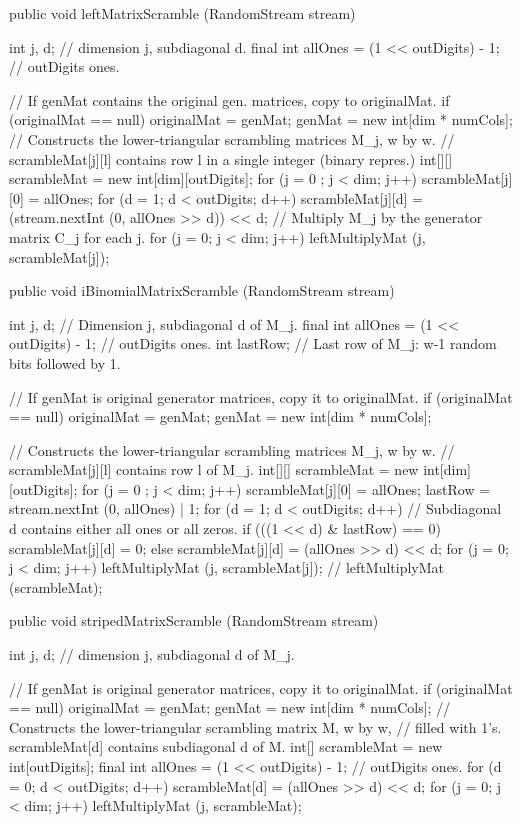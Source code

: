 \begin{code}
\begin{hide}
   public void leftMatrixScramble (RandomStream stream) {
      int j, d;  // dimension j, subdiagonal d.
      final int allOnes = (1 << outDigits) - 1;    // outDigits ones.

      // If genMat contains the original gen. matrices, copy to originalMat.
      if (originalMat == null) {
         originalMat = genMat;
         genMat = new int[dim * numCols];
      }
      // Constructs the lower-triangular scrambling matrices M_j, w by w.
      // scrambleMat[j][l] contains row l in a single integer (binary repres.)
      int[][] scrambleMat = new int[dim][outDigits];
      for (j = 0 ; j < dim; j++) {
         scrambleMat[j][0] = allOnes;
         for (d = 1; d < outDigits; d++)
            scrambleMat[j][d] = (stream.nextInt (0, allOnes >> d)) << d;
      }
      // Multiply M_j by the generator matrix C_j for each j.
      for (j = 0; j < dim; j++) leftMultiplyMat (j, scrambleMat[j]);
   }


   public void iBinomialMatrixScramble (RandomStream stream) {
      int j, d;     // Dimension j, subdiagonal d of M_j.
      final int allOnes = (1 << outDigits) - 1;    // outDigits ones.
      int lastRow;  // Last row of M_j: w-1 random bits followed by 1.

      // If genMat is original generator matrices, copy it to originalMat.
      if (originalMat == null) {
         originalMat = genMat;
         genMat = new int[dim * numCols];
      }

      // Constructs the lower-triangular scrambling matrices M_j, w by w.
      // scrambleMat[j][l] contains row l of M_j.
      int[][] scrambleMat = new int[dim][outDigits];
      for (j = 0 ; j < dim; j++) {
         scrambleMat[j][0] = allOnes;
         lastRow = stream.nextInt (0, allOnes) | 1;
         for (d = 1; d < outDigits; d++)
            // Subdiagonal d contains either all ones or all zeros.
            if (((1 << d) & lastRow) == 0) scrambleMat[j][d] = 0;
            else scrambleMat[j][d] = (allOnes >> d) << d;
      }
      for (j = 0; j < dim; j++) leftMultiplyMat (j, scrambleMat[j]);
      // leftMultiplyMat (scrambleMat);
   }

   public void stripedMatrixScramble (RandomStream stream) {
      int j, d;  // dimension j, subdiagonal d of M_j.

      // If genMat is original generator matrices, copy it to originalMat.
      if (originalMat == null) {
         originalMat = genMat;
         genMat = new int[dim * numCols];
      }
      // Constructs the lower-triangular scrambling matrix M, w by w,
      // filled with 1's.  scrambleMat[d] contains subdiagonal d of M.
      int[] scrambleMat = new int[outDigits];
      final int allOnes = (1 << outDigits) - 1;    // outDigits ones.
      for (d = 0; d < outDigits; d++)
         scrambleMat[d] = (allOnes >> d) << d;
      for (j = 0; j < dim; j++) leftMultiplyMat (j, scrambleMat);
   }



\end{hide}
\end{code}
